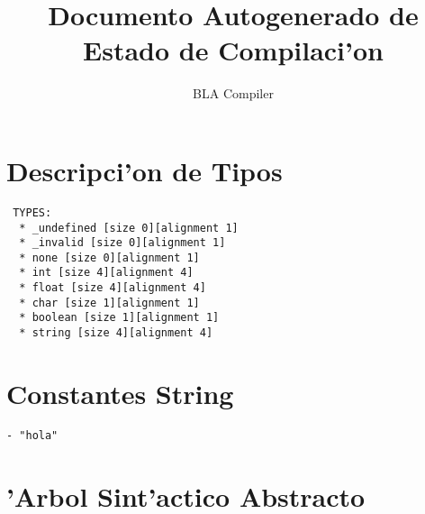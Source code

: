 \documentclass[oneside,12pt,letterpaper]{article}
\theoremstyle{definition} \newtheorem{definicion}{Definici\'{o}n}
\theoremstyle{plain} \newtheorem{teorema}{Teorema}
\theoremstyle{plain} \newtheorem{lema}{Lema}
\begin{document}
\title{Documento Autogenerado de Estado de Compilaci'on}

\author{BLA Compiler}

\maketitle

\pagebreak

\section{Descripci'on de Tipos}
\begin{verbatim}
 TYPES:
  * _undefined [size 0][alignment 1]
  * _invalid [size 0][alignment 1]
  * none [size 0][alignment 1]
  * int [size 4][alignment 4]
  * float [size 4][alignment 4]
  * char [size 1][alignment 1]
  * boolean [size 1][alignment 1]
  * string [size 4][alignment 4]
\end{verbatim}

\section{Constantes String}
\begin{verbatim}
- "hola"
\end{verbatim}

\section{'Arbol Sint'actico Abstracto}
\end{document}
